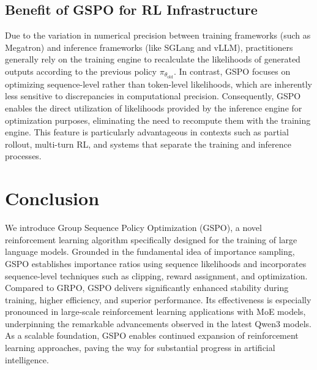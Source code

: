 \subsection{Benefit of GSPO for RL Infrastructure}

Due to the variation in numerical precision between training frameworks (such as Megatron) and inference frameworks (like SGLang and vLLM), practitioners generally rely on the training engine to recalculate the likelihoods of generated outputs according to the previous policy $\pi_{\theta_\text{old}}$. In contrast, GSPO focuses on optimizing sequence-level rather than token-level likelihoods, which are inherently less sensitive to discrepancies in computational precision. Consequently, GSPO enables the direct utilization of likelihoods provided by the inference engine for optimization purposes, eliminating the need to recompute them with the training engine. This feature is particularly advantageous in contexts such as partial rollout, multi-turn RL, and systems that separate the training and inference processes.

\section{Conclusion}

We introduce Group Sequence Policy Optimization (GSPO), a novel reinforcement learning algorithm specifically designed for the training of large language models. Grounded in the fundamental idea of importance sampling, GSPO establishes importance ratios using sequence likelihoods and incorporates sequence-level techniques such as clipping, reward assignment, and optimization. Compared to GRPO, GSPO delivers significantly enhanced stability during training, higher efficiency, and superior performance. Its effectiveness is especially pronounced in large-scale reinforcement learning applications with MoE models, underpinning the remarkable advancements observed in the latest Qwen3 models. As a scalable foundation, GSPO enables continued expansion of reinforcement learning approaches, paving the way for substantial progress in artificial intelligence.

